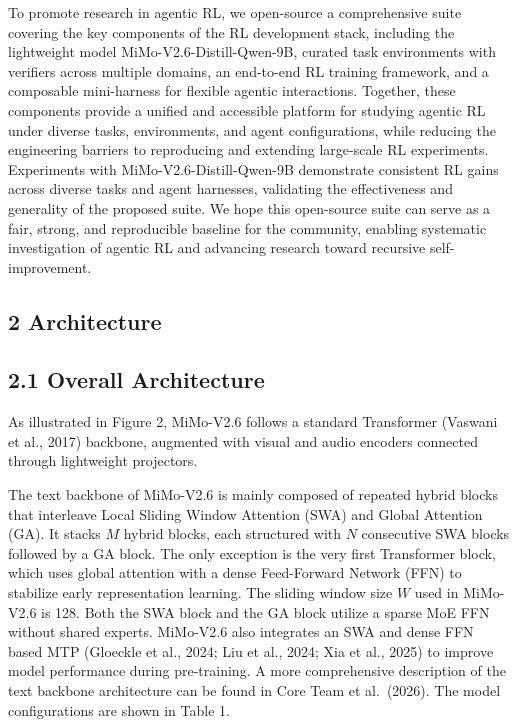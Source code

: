 \documentclass[
  10
]{article}
\begin{document}
To promote research in agentic RL, we open-source a comprehensive suite
covering the key components of the RL development stack, including the
lightweight model MiMo-V2.6-Distill-Qwen-9B, curated task environments
with verifiers across multiple domains, an end-to-end RL training
framework, and a composable mini-harness for flexible agentic
interactions. Together, these components provide a unified and
accessible platform for studying agentic RL under diverse tasks,
environments, and agent configurations, while reducing the engineering
barriers to reproducing and extending large-scale RL experiments.
Experiments with MiMo-V2.6-Distill-Qwen-9B demonstrate consistent RL
gains across diverse tasks and agent harnesses, validating the
effectiveness and generality of the proposed suite. We hope this
open-source suite can serve as a fair, strong, and reproducible baseline
for the community, enabling systematic investigation of agentic RL and
advancing research toward recursive self-improvement.

\subsection{2 Architecture}\label{architecture}

\subsection{2.1 Overall Architecture}\label{overall-architecture}

As illustrated in Figure 2, MiMo-V2.6 follows a standard Transformer
(Vaswani et al., 2017) backbone, augmented with visual and audio
encoders connected through lightweight projectors.

The text backbone of MiMo-V2.6 is mainly composed of repeated hybrid
blocks that interleave Local Sliding Window Attention (SWA) and Global
Attention (GA). It stacks $M$ hybrid blocks, each structured with $N$
consecutive SWA blocks followed by a GA block. The only exception is the
very first Transformer block, which uses global attention with a dense
Feed-Forward Network (FFN) to stabilize early representation learning.
The sliding window size $W$ used in MiMo-V2.6 is 128. Both the SWA block
and the GA block utilize a sparse MoE FFN without shared experts.
MiMo-V2.6 also integrates an SWA and dense FFN based MTP (Gloeckle et
al., 2024; Liu et al., 2024; Xia et al., 2025) to improve model
performance during pre-training. A more comprehensive description of the
text backbone architecture can be found in Core Team et al.~(2026). The
model configurations are shown in Table 1.
\end{document}

